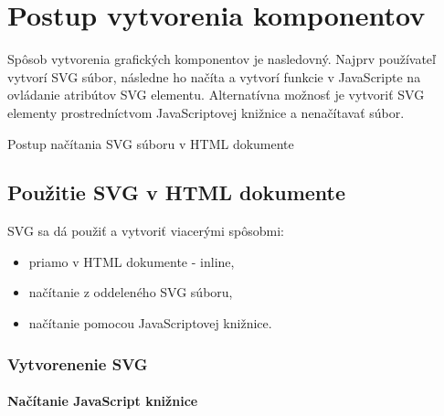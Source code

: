 \chapter{Postup vytvorenia komponentov}

Spôsob vytvorenia grafických komponentov je nasledovný. Najprv používateľ vytvorí SVG súbor, následne ho načíta a vytvorí funkcie v JavaScripte na ovládanie atribútov SVG elementu. 
Alternatívna možnosť je vytvoriť SVG elementy prostredníctvom JavaScriptovej knižnice a nenačítavať súbor. 


Postup načítania SVG súboru v HTML dokumente

\section{Použitie SVG v HTML dokumente}

SVG sa dá použiť a vytvoriť viacerými spôsobmi:
\begin{itemize}
	\item priamo v HTML dokumente - inline, 
	\item načítanie z oddeleného SVG súboru,
	\item načítanie pomocou JavaScriptovej knižnice.
\end{itemize}


 \subsection{Vytvorenenie SVG }
 
 
 \subsubsection{Načítanie JavaScript knižnice}

